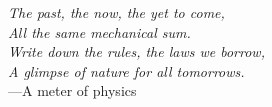 \begin{center}
\emph{
    The past, the now, the yet to come,\\
    All the same mechanical sum.\\
    Write down the rules, the laws we borrow,\\
    A glimpse of nature for all tomorrows.\\
}
---A meter of physics\,\\
\end{center}

